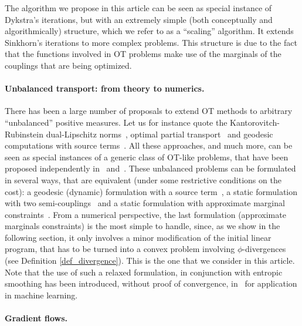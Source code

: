 The algorithm we propose in this article can be seen as special instance of Dykstra's iterations, but with an extremely simple (both conceptually and algorithmically) structure, which we refer to as a ``scaling'' algorithm. It extends Sinkhorn's iterations to more complex problems. This structure is due to the fact that the functions involved in OT problems make use of the marginals of the couplings that are being optimized. 

\paragraph{Unbalanced transport: from theory to numerics.}


There has been a large number of proposals to extend OT methods to arbitrary ``unbalanced'' positive measures. Let us for instance quote the Kantorovitch-Rubinstein dual-Lipschitz norms~\cite{hanin1992kantorovich}, optimal partial transport~\cite{figalli2010optimal} and geodesic computations with source terms~\cite{piccoli2014generalized}. All these approaches, and much more, can be seen as special instances of a generic class of OT-like problems, that have been proposed independently in~\cite{LieroMielkeSavareLong} and~\cite{2015-chizat-unbalanced}.
%
These unbalanced problems can be formulated in several ways, that are equivalent (under some restrictive conditions on the cost): a geodesic (dynamic) formulation with a source term~\cite{kondratyev2015,2015-chizat-interpolating,LieroMielkeSavareShort}, a static formulation with two semi-couplings~\cite{2015-chizat-unbalanced} and a static formulation with approximate marginal constraints~\cite{LieroMielkeSavareLong}. 
%
From a numerical perspective, the last formulation (approximate marginals constraints) is the most simple to handle, since, as we show in the following section, it only involves a minor modification of the initial linear program, that has to be turned into a convex problem involving $\phi$-divergences (see Definition \ref{def_divergence}). This is the one that we consider in this article. 
% 
Note that the use of such a relaxed formulation, in conjunction with entropic smoothing has been introduced, without proof of convergence, in~\cite{FrognerNIPS} for application in machine learning.  


\paragraph{Gradient flows.}


